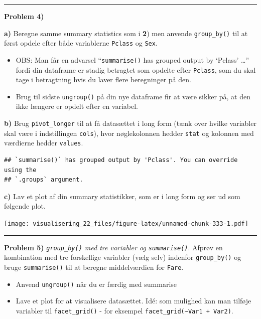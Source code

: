 \documentclass[
]{book}
\providecommand{\tightlist}{%
  \setlength{\itemsep}{0pt}\setlength{\parskip}{0pt}}
\begin{document}
\begin{center}\rule{0.5\linewidth}{0.5pt}\end{center}

\textbf{Problem 4)}

\textbf{a)} Beregne samme summary statistics som i \textbf{2}) men anvende \texttt{group\_by()} til at først opdele efter både variablerne \texttt{Pclass} og \texttt{Sex}.

\begin{itemize}
\tightlist
\item
  OBS: Man får en advarsel ``\texttt{summarise()} has grouped output by `Pclass' \ldots{}'' fordi din dataframe er stadig betragtet som opdelte efter \texttt{Pclass}, som du skal tage i betragtning hvis du laver flere beregninger på den.
\item
  Brug til sidste \texttt{ungroup()} på din nye dataframe fir at være sikker på, at den ikke længere er opdelt efter en variabel.
\end{itemize}

\textbf{b)} Brug \texttt{pivot\_longer} til at få datasættet i long form (tænk over hvilke variabler skal være i indstillingen \texttt{cols}), hvor nøglekolonnen hedder \texttt{stat} og kolonnen med værdierne hedder \texttt{values}.

\begin{verbatim}
## `summarise()` has grouped output by 'Pclass'. You can override using the
## `.groups` argument.
\end{verbatim}

\textbf{c)} Lav et plot af din summary statistikker, som er i long form og ser ud som følgende plot.

\texttt{[image: visualisering\_22\_files/figure-latex/unnamed-chunk-333-1.pdf]}

\begin{center}\rule{0.5\linewidth}{0.5pt}\end{center}

\textbf{Problem 5)} \emph{\texttt{group\_by()} med tre variabler og \texttt{summarise()}}. Afprøv en kombination med tre forskellige variabler (vælg selv) indenfor \texttt{group\_by()} og bruge \texttt{summarise()} til at beregne middelværdien for \texttt{Fare}.

\begin{itemize}
\tightlist
\item
  Anvend \texttt{ungroup()} når du er færdig med summarise
\item
  Lave et plot for at visualisere datasættet. Idé: som mulighed kan man tilføje variabler til \texttt{facet\_grid()} - for eksempel \texttt{facet\_grid(\textasciitilde{}Var1\ +\ Var2)}.
\end{itemize}
\end{document}
